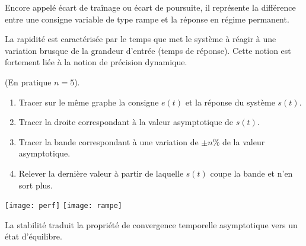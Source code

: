 \begin{defi}

Encore appelé écart de traînage ou écart de poursuite, il représente la différence entre une consigne variable de type rampe et la réponse en régime permanent. 
\end{defi}

\begin{defi}[Rapidité]

La rapidité est caractérisée par le temps que met le système à réagir à une
variation brusque de la grandeur d'entrée (temps de réponse). Cette notion est
fortement liée à la notion de précision dynamique.
\end{defi}

\begin{methode}
 (En pratique $n=5$).\\

\begin{enumerate}
 \item Tracer sur le même graphe la consigne $e(t)$ et la réponse du système
$s(t)$.
\item Tracer la droite correspondant à la valeur asymptotique de $s(t)$.
\item Tracer la bande correspondant à une variation de $\pm n\%$ de la valeur
asymptotique.
\item Relever la dernière valeur à partir de laquelle $s(t)$ coupe la bande et
n'en sort plus.
\end{enumerate}
\end{methode}


\begin{center}
%
\texttt{[image: perf]}
\hfill
%
\texttt{[image: rampe]}
\end{center}

\begin{defi}[Stabilité]

La stabilité traduit la propriété de convergence temporelle asymptotique vers
un état d'équilibre. 
\end{defi}




